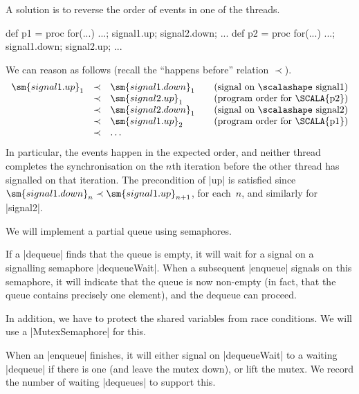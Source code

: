 
\begin{slide}

A solution is to reverse the order of events in one of the threads.
\begin{scala}
def p1 = proc{ for(...){ ...; signal1.up; signal2.down; ... } }
def p2 = proc{ for(...){ ...; signal1.down; signal2.up; ... } }
\end{scala}
%
We can reason as follows (recall the ``happens before'' relation $\prec$).
\[
\begin{array}{rcl@{\qquad}l}
\sm{signal1.up}_1 & \prec & \sm{signal1.down}_1 & 
  \mbox{(signal on {\scalashape signal1})} \\
 & \prec & \sm{signal2.up}_1 & \mbox{(program order for \SCALA{p2})} \\
 & \prec & \sm{signal2.down}_1 & \mbox{(signal on {\scalashape signal2})} \\
 & \prec & \sm{signal1.up}_2 & \mbox{(program order for \SCALA{p1})} \\
 & \prec & \ldots
\end{array}
\]
In particular, the events happen in the expected order, and neither thread
completes the synchronisation on the $n$th iteration before the other thread
has signalled on that iteration.
%
The precondition of |up| is satisfied since $\sm{signal1.down}_n \prec
\sm{signal1.up}_{n+1}$, for each~$n$, and similarly for |signal2|.
\end{slide}


\begin{slide}

We will implement a partial queue using semaphores.  

If a |dequeue| finds that the queue is empty, it will wait for a signal on a
signalling semaphore |dequeueWait|.  When a subsequent |enqueue| signals on
this semaphore, it will indicate that the queue is now non-empty (in fact,
that the queue contains precisely one element), and the dequeue can proceed.

In addition, we have to protect the shared variables from race conditions.  We
will use a |MutexSemaphore| for this. 

When an |enqueue| finishes, it will either signal on |dequeueWait| to a
waiting |dequeue| if there is one (and leave the mutex down), or lift the
mutex.  We record the number of waiting |dequeues| to support this.
\end{slide}

